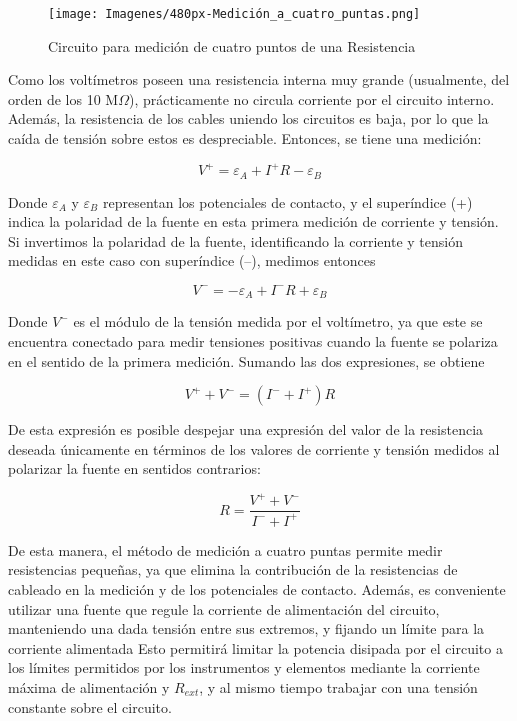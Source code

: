 
\begin{figure}[h!]
        \centering        \texttt{[image: Imagenes/480px-Medición\_a\_cuatro\_puntas.png]}
        \caption{Circuito para medición de cuatro puntos de una Resistencia}
        \label{fig:ej4puntas}
\end{figure}

Como los voltímetros poseen una resistencia interna muy grande (usualmente, del orden de los 10 M$\Omega$), prácticamente no circula corriente por el circuito interno. Además, la resistencia de los cables uniendo los circuitos es baja, por lo que la caída de tensión sobre estos es despreciable. Entonces, se tiene una medición:

\begin{equation}
    V^{+}=\varepsilon_{A}+I^{+}R-\varepsilon_{B}
\end{equation}

Donde $\varepsilon _{A}$ y 
$\varepsilon _{B}$ representan los potenciales de contacto, y el superíndice (+) indica la polaridad de la fuente en esta primera medición de corriente y tensión. Si invertimos la polaridad de la fuente, identificando la corriente y tensión medidas en este caso con superíndice (–), medimos entonces

\begin{equation}
    V^{-}=-\varepsilon_{A}+I^{-}R+\varepsilon_{B}
\end{equation}

Donde $V^{-}$ es el módulo de la tensión medida por el voltímetro, ya que este se encuentra conectado para medir tensiones positivas cuando la fuente se polariza en el sentido de la primera medición. Sumando las dos expresiones, se obtiene

\begin{equation}
    V^{+}+V^{-}=(I^{-}+I^{+})R
\end{equation}

De esta expresión es posible despejar una expresión del valor de la resistencia deseada únicamente en términos de los valores de corriente y tensión medidos al polarizar la fuente en sentidos contrarios:

\begin{equation}
    R={\frac {V^{+}+V^{-}}{I^{-}+I^{+}}}
\end{equation}

De esta manera, el método de medición a cuatro puntas permite medir resistencias pequeñas, ya que elimina la contribución de la resistencias de cableado en la medición y de los potenciales de contacto. Además, es conveniente utilizar una fuente que regule la corriente de alimentación del circuito, manteniendo una dada tensión entre sus extremos, y fijando un límite para la corriente alimentada Esto permitirá limitar la potencia disipada por el circuito a los límites permitidos por los instrumentos y elementos mediante la corriente máxima de alimentación y $R_{ext}$, y al mismo tiempo trabajar con una tensión constante sobre el circuito.









